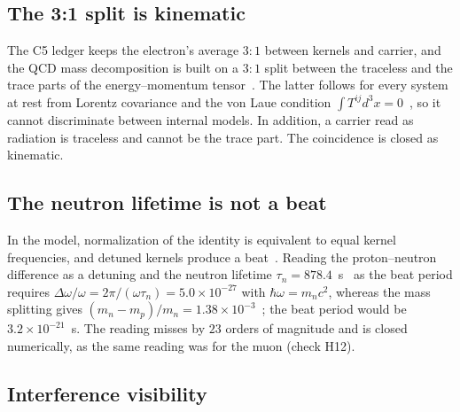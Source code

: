 \documentclass[%
 reprint, amsmath,amssymb, aps, prb, ]{revtex4-2}
\numberwithin{equation}{section}
\begin{document}
\subsection{The 3:1 split is kinematic}

The C5 ledger keeps the electron's average $3{:}1$ between kernels and carrier, and the QCD mass decomposition is built on a $3{:}1$ split between the traceless and the trace parts of the energy--momentum tensor~\cite{ref:ji95}. The latter follows for every system at rest from Lorentz covariance and the von Laue condition $\int T^{ij}d^3x=0$~\cite{ref:ps18}, so it cannot discriminate between internal models. In addition, a carrier read as radiation is traceless and cannot be the trace part. The coincidence is closed as kinematic.

\subsection{The neutron lifetime is not a beat}

In the model, normalization of the identity is equivalent to equal kernel frequencies, and detuned kernels produce a beat~\cite{ref:trunks}. Reading the proton--neutron difference as a detuning and the neutron lifetime $\tau_n=878.4$~s~\cite{ref:pdg} as the beat period requires $\Delta\omega/\omega=2\pi/(\omega\tau_n)=5.0\times10^{-27}$ with $\hbar\omega=m_nc^2$, whereas the mass splitting gives $(m_n-m_p)/m_n=1.38\times10^{-3}$~\cite{ref:codata}; the beat period would be $3.2\times10^{-21}$~s. The reading misses by $23$ orders of magnitude and is closed numerically, as the same reading was for the muon (check H12).

\subsection{Interference visibility}
\end{document}
